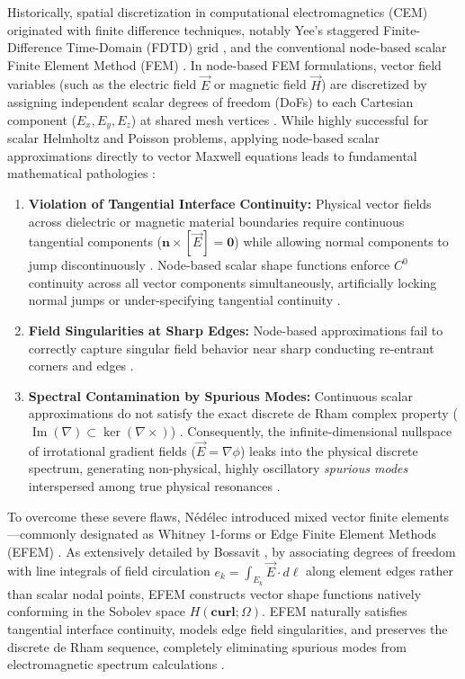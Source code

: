 \documentclass[preprint,12pt]{elsarticle}
\begin{document}
Historically, spatial discretization in computational electromagnetics (CEM) originated with finite difference techniques, notably Yee's staggered Finite-Difference Time-Domain (FDTD) grid \cite{yee1966numerical}, and the conventional node-based scalar Finite Element Method (FEM) \cite{jin2014finite}. In node-based FEM formulations, vector field variables (such as the electric field $\vec{E}$ or magnetic field $\vec{H}$) are discretized by assigning independent scalar degrees of freedom (DoFs) to each Cartesian component ($E_x, E_y, E_z$) at shared mesh vertices \cite{jin2014finite, bossavit1990spurious}. While highly successful for scalar Helmholtz and Poisson problems, applying node-based scalar approximations directly to vector Maxwell equations leads to fundamental mathematical pathologies \cite{bossavit1990spurious, boffi1999computational}:
\begin{enumerate}
    \item \textbf{Violation of Tangential Interface Continuity:} Physical vector fields across dielectric or magnetic material boundaries require continuous tangential components ($\mathbf{n} \times [\vec{E}] = \mathbf{0}$) while allowing normal components to jump discontinuously  \cite{jin2014finite, monk2003finite}. Node-based scalar shape functions enforce $C^0$ continuity across all vector components simultaneously, artificially locking normal jumps or under-specifying tangential continuity \cite{bossavit1990spurious}.
    \item \textbf{Field Singularities at Sharp Edges:} Node-based approximations fail to correctly capture singular field behavior near sharp conducting re-entrant corners and edges \cite{monk2003finite, boffi1999computational}.
    \item \textbf{Spectral Contamination by Spurious Modes:} Continuous scalar approximations do not satisfy the exact discrete de Rham complex property ($\operatorname{Im}(\nabla) \subset \ker(\nabla \times)$) \cite{monk2003finite, bossavit1990spurious}. Consequently, the infinite-dimensional nullspace of irrotational gradient fields ($\vec{E} = \nabla \phi$) leaks into the physical discrete spectrum, generating non-physical, highly oscillatory \emph{spurious modes} interspersed among true physical resonances \cite{bossavit1990spurious, boffi1999computational}.
\end{enumerate}

To overcome these severe flaws, N\'ed\'elec \cite{nedelec1980mixed} introduced mixed vector finite elements---commonly designated as Whitney 1-forms or Edge Finite Element Methods (EFEM) \cite{monk2003finite, bossavit1998computational}. As extensively detailed by Bossavit \cite{bossavit1998computational}, by associating degrees of freedom with line integrals of field circulation $e_k = \int_{E_k} \vec{E} \cdot d\boldsymbol{\ell}$ along element edges rather than scalar nodal points, EFEM constructs vector shape functions natively conforming in the Sobolev space $H(\mathbf{curl}; \Omega)$. EFEM naturally satisfies tangential interface continuity, models edge field singularities, and preserves the discrete de Rham sequence, completely eliminating spurious modes from electromagnetic spectrum calculations \cite{monk2003finite, bossavit1990spurious, bossavit1998computational}.
\end{document}
